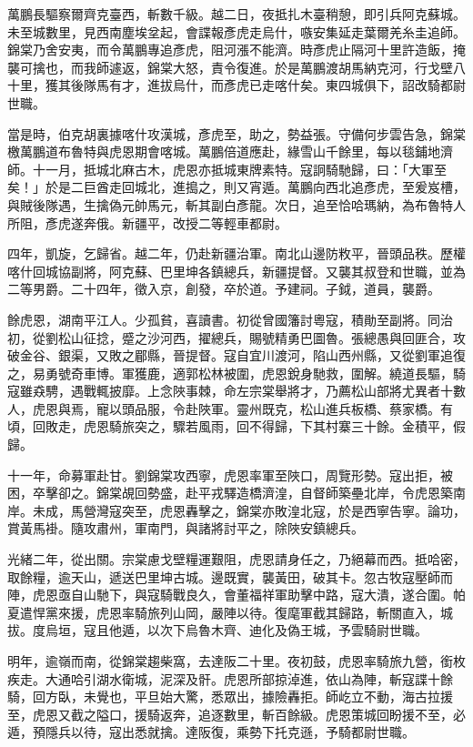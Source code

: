 \begin{pinyinscope}
萬鵬長驅察爾齊克臺西，斬數千級。越二日，夜抵扎木臺稍憩，即引兵阿克蘇城。未至城數里，見西南塵埃坌起，會諜報彥虎走烏什，嗾安集延走葉爾羌糸圭追師。錦棠乃舍安夷，而令萬鵬專追彥虎，阻河漲不能濟。時彥虎止隔河十里許造飯，掩襲可擒也，而我師遽返，錦棠大怒，責令復進。於是萬鵬渡胡馬納克河，行戈壁八十里，獲其後隊馬有才，進拔烏什，而彥虎已走喀什矣。東四城俱下，詔改騎都尉世職。

當是時，伯克胡裏據喀什攻漢城，彥虎至，助之，勢益張。守備何步雲告急，錦棠檄萬鵬道布魯特與虎恩期會喀城。萬鵬倍道應赴，緣雪山千餘里，每以毯鋪地濟師。十一月，抵城北麻古木，虎恩亦抵城東牌素特。寇詗騎馳歸，曰：「大軍至矣！」於是二巨酋走回城北，進搗之，則又宵遁。萬鵬向西北追彥虎，至爰岌槽，與賊後隊遇，生擒偽元帥馬元，斬其副白彥龍。次日，追至恰哈瑪納，為布魯特人所阻，彥虎遂奔俄。新疆平，改授二等輕車都尉。

四年，凱旋，乞歸省。越二年，仍赴新疆治軍。南北山邊防敉平，晉頭品秩。歷權喀什回城協副將，阿克蘇、巴里坤各鎮總兵，新疆提督。又襲其叔登和世職，並為二等男爵。二十四年，徵入京，創發，卒於道。予建祠。子鉞，道員，襲爵。

餘虎恩，湖南平江人。少孤貧，喜讀書。初從曾國籓討粵寇，積勛至副將。同治初，從劉松山征捻，蹙之沙河西，擢總兵，賜號精勇巴圖魯。張總愚與回匪合，攻破金谷、銀渠，又敗之郿縣，晉提督。寇自宜川渡河，陷山西州縣，又從劉軍追復之，易勇號奇車博。軍獲鹿，適郭松林被圍，虎恩銳身馳救，圍解。繞道長驅，騎寇雖猋騁，遇戰輒披靡。上念陜事棘，命左宗棠舉將才，乃薦松山部將尤異者十數人，虎恩與焉，寵以頭品服，令赴陜軍。靈州既克，松山進兵板橋、蔡家橋。有頃，回敗走，虎恩騎旅突之，驟若風雨，回不得歸，下其村寨三十餘。金積平，假歸。

十一年，命募軍赴甘。劉錦棠攻西寧，虎恩率軍至陜口，周覽形勢。寇出拒，被困，卒擊卻之。錦棠覘回勢盛，赴平戎驛造橋濟湟，自督師築壘北岸，令虎恩築南岸。未成，馬營灣寇突至，虎恩轟擊之，錦棠亦敗湟北寇，於是西寧告寧。論功，賞黃馬褂。隨攻肅州，軍南門，與諸將討平之，除陜安鎮總兵。

光緒二年，從出關。宗棠慮戈壁糧運艱阻，虎恩請身任之，乃絕幕而西。抵哈密，取餘糧，逾天山，遞送巴里坤古城。邊既實，襲黃田，破其卡。忽古牧寇壓師而陣，虎恩亟自山馳下，與寇騎戰良久，會董福祥軍助擊中路，寇大潰，遂合圍。帕夏遣悍黨來援，虎恩率騎旅列山岡，嚴陣以待。復麾軍截其歸路，斬關直入，城拔。度烏垣，寇且他遁，以次下烏魯木齊、迪化及偽王城，予雲騎尉世職。

明年，逾嶺而南，從錦棠趨柴窩，去達阪二十里。夜初鼓，虎恩率騎旅九營，銜枚疾走。大通哈引湖水衛城，泥深及骭。虎恩所部掠淖進，依山為陣，斬寇諜十餘騎，回方臥，未覺也，平旦始大驚，悉眾出，據險轟拒。師屹立不動，海古拉援至，虎恩又截之隘口，援騎返奔，追逐數里，斬百餘級。虎恩策城回盼援不至，必遁，預隱兵以待，寇出悉就擒。達阪復，乘勢下托克遜，予騎都尉世職。


\end{pinyinscope}
